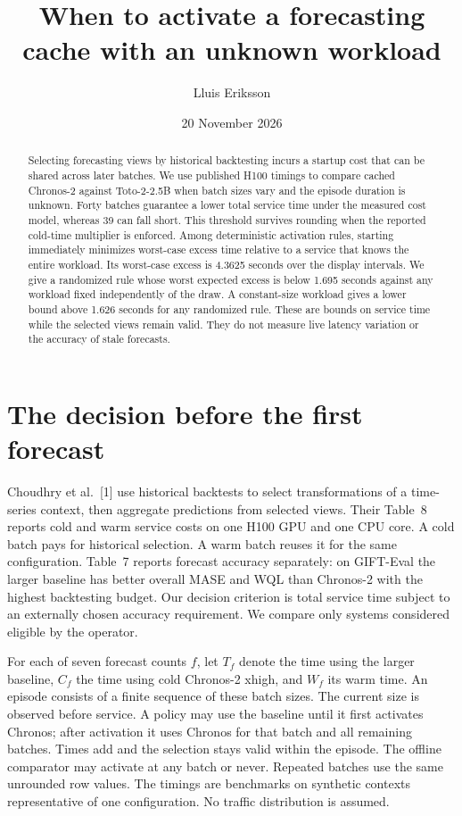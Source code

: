 \documentclass[11pt]{article}
\title{When to activate a forecasting cache with an unknown workload}
\author{Lluis Eriksson}
\date{20 November 2026}
\begin{document}
\maketitle
\begin{abstract}
Selecting forecasting views by historical backtesting incurs a startup cost that can be shared across later batches. We use published H100 timings to compare cached Chronos-2 against Toto-2-2.5B when batch sizes vary and the episode duration is unknown. Forty batches guarantee a lower total service time under the measured cost model, whereas 39 can fall short. This threshold survives rounding when the reported cold-time multiplier is enforced. Among deterministic activation rules, starting immediately minimizes worst-case excess time relative to a service that knows the entire workload. Its worst-case excess is 4.3625 seconds over the display intervals. We give a randomized rule whose worst expected excess is below 1.695 seconds against any workload fixed independently of the draw. A constant-size workload gives a lower bound above 1.626 seconds for any randomized rule. These are bounds on service time while the selected views remain valid. They do not measure live latency variation or the accuracy of stale forecasts.
\end{abstract}
\section{The decision before the first forecast}
Choudhry et al.\ [1] use historical backtests to select transformations of a time-series context, then aggregate predictions from selected views. Their Table~8 reports cold and warm service costs on one H100 GPU and one CPU core. A cold batch pays for historical selection. A warm batch reuses it for the same configuration. Table~7 reports forecast accuracy separately: on GIFT-Eval the larger baseline has better overall MASE and WQL than Chronos-2 with the highest backtesting budget. Our decision criterion is total service time subject to an externally chosen accuracy requirement. We compare only systems considered eligible by the operator.

For each of seven forecast counts $f$, let $T_f$ denote the time using the larger baseline, $C_f$ the time using cold Chronos-2 xhigh, and $W_f$ its warm time. An episode consists of a finite sequence of these batch sizes. The current size is observed before service. A policy may use the baseline until it first activates Chronos; after activation it uses Chronos for that batch and all remaining batches. Times add and the selection stays valid within the episode. The offline comparator may activate at any batch or never. Repeated batches use the same unrounded row values. The timings are benchmarks on synthetic contexts representative of one configuration. No traffic distribution is assumed.
\end{document}
